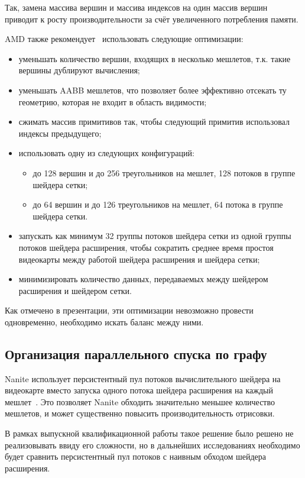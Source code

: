 Так, замена массива вершин и массива индексов на один массив вершин приводит к росту производительности за счёт увеличенного потребления памяти.

AMD также рекомендует~\cite{AMDMeshletsRecommendations} использовать следующие оптимизации:
\begin{itemize}
    \item уменьшать количество вершин, входящих в несколько мешлетов, т.к. такие вершины дублируют вычисления;
    \item уменьшать AABB мешлетов, что позволяет более эффективно отсекать ту геометрию, которая не входит в область видимости;
    \item сжимать массив примитивов так, чтобы следующий примитив использовал индексы предыдущего;
    \item использовать одну из следующих конфигураций:
    \begin{itemize}
        \item до 128 вершин и до 256 треугольников на мешлет, 128 потоков в группе шейдера сетки;
        \item до 64 вершин и до 126 треугольников на мешлет, 64 потока в группе шейдера сетки.
    \end{itemize}
    \item запускать как минимум 32 группы потоков шейдера сетки из одной группы потоков шейдера расширения, чтобы сократить среднее время простоя видеокарты между работой шейдера расширения и шейдера сетки;
    \item минимизировать количество данных, передаваемых между шейдером расширения и шейдером сетки.
\end{itemize}

Как отмечено в презентации, эти оптимизации невозможно провести одновременно, необходимо искать баланс между ними.

\subsection*{Организация параллельного спуска по графу}
Nanite использует персистентный пул потоков вычислительного шейдера на видеокарте вместо запуска одного потока шейдера расширения на каждый мешлет~\cite{KarisNanite}.
Это позволяет Nanite обходить значительно меньшее количество мешлетов, и может существенно повысить производительность отрисовки.

В рамках выпускной квалификационной работы такое решение было решено не реализовывать ввиду его сложности, но в дальнейших исследованиях необходимо будет сравнить персистентный пул потоков с наивным обходом шейдера расширения.

